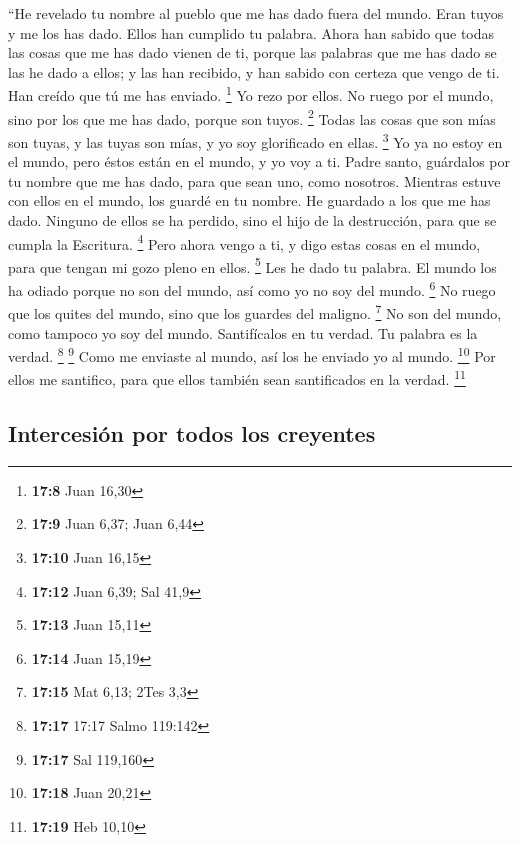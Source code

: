 \begin{paracol}{2}
 ``He revelado tu nombre al pueblo que me has dado fuera
del mundo. Eran tuyos y me los has dado. Ellos han cumplido tu palabra.
 Ahora han sabido que todas las cosas que me has dado
vienen de ti,  porque las palabras que me has dado se las
he dado a ellos; y las han recibido, y han sabido con certeza que vengo
de ti. Han creído que tú me has enviado. \footnote{\textbf{17:8} Juan
  16,30}  Yo rezo por ellos. No ruego por el mundo, sino
por los que me has dado, porque son tuyos. \footnote{\textbf{17:9} Juan
  6,37; Juan 6,44}  Todas las cosas que son mías son
tuyas, y las tuyas son mías, y yo soy glorificado en ellas. \footnote{\textbf{17:10}
  Juan 16,15}  Yo ya no estoy en el mundo, pero éstos
están en el mundo, y yo voy a ti. Padre santo, guárdalos por tu nombre
que me has dado, para que sean uno, como nosotros. 
Mientras estuve con ellos en el mundo, los guardé en tu nombre. He
guardado a los que me has dado. Ninguno de ellos se ha perdido, sino el
hijo de la destrucción, para que se cumpla la Escritura. \footnote{\textbf{17:12}
  Juan 6,39; Sal 41,9}  Pero ahora vengo a ti, y digo
estas cosas en el mundo, para que tengan mi gozo pleno en ellos.
\footnote{\textbf{17:13} Juan 15,11}  Les he dado tu
palabra. El mundo los ha odiado porque no son del mundo, así como yo no
soy del mundo. \footnote{\textbf{17:14} Juan 15,19}  No
ruego que los quites del mundo, sino que los guardes del maligno.
\footnote{\textbf{17:15} Mat 6,13; 2Tes 3,3}  No son del
mundo, como tampoco yo soy del mundo.  Santifícalos en tu
verdad. Tu palabra es la verdad. \footnote{\textbf{17:17} 17:17 Salmo
  119:142} \footnote{\textbf{17:17} Sal 119,160}  Como me
enviaste al mundo, así los he enviado yo al mundo. \footnote{\textbf{17:18}
  Juan 20,21}  Por ellos me santifico, para que ellos
también sean santificados en la verdad. \footnote{\textbf{17:19} Heb
  10,10}

\hypertarget{intercesiuxf3n-por-todos-los-creyentes}{%
\subsection{Intercesión por todos los
creyentes}\label{intercesiuxf3n-por-todos-los-creyentes}}


\end{paracol}
